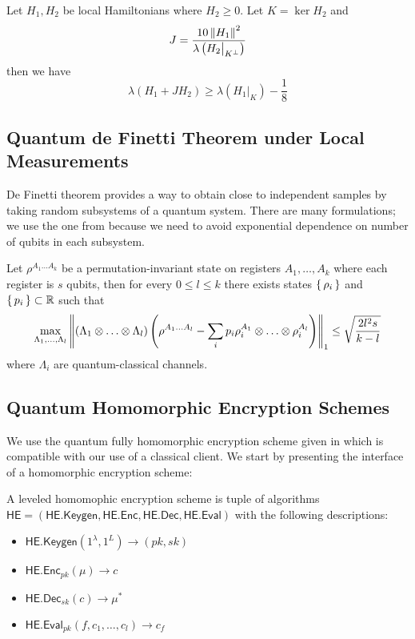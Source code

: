 \begin{thm}
	\label{thm:projection}
	Let $H_1, H_2$ be local Hamiltonians where $H_2\geq0$. Let $K=\ker H_2$ and
	$$J=\frac{10\left\lVert H_1\right\rVert^2}{\lambda\left(H_2\big|_{K^\bot}\right)}$$
	then we have
	$$\lambda(H_1+JH_2)\geq\lambda\left(H_1\big|_K\right)-\frac{1}{8}$$
\end{thm}

\subsection{Quantum de Finetti Theorem under Local Measurements}

De Finetti theorem provides a way to obtain close to independent samples by taking random subsystems of a quantum system.
There are many formulations; we use the one from \cite{Brandão2017} because we need to avoid exponential dependence on number of qubits in each subsystem.
\begin{thm}
	\label{deFinetti}
	Let $\rho^{A_1\ldots A_k}$ be a permutation-invariant state on registers $A_1,\ldots,A_k$ where each register is $s$ qubits,
	then for every $0\leq l\leq k$ there exists states $\set{\rho_i}$ and $\set{p_i}\subset\mathbb{R}$ such that
	$$\max_{\Lambda_1,\ldots,\Lambda_l}
	\left\lVert(\Lambda_1\otimes\ldots\otimes\Lambda_l)\left(\rho^{A_1\ldots A_l}-\sum_ip_i\rho_i^{A_1}\otimes\ldots\otimes\rho_i^{A_l}\right)\right\rVert_1
	\leq\sqrt{\frac{2l^2s}{k-l}}$$
	where $\Lambda_i$ are quantum-classical channels.
\end{thm}

\subsection{Quantum Homomorphic Encryption Schemes}

\def\QHE{\mathsf{QHE}}
\def\QGen{\mathsf{QHE.Keygen}}
\def\QEnc{\mathsf{QHE.Enc}}
\def\QEval{\mathsf{QHE.Eval}}
\def\QDec{\mathsf{QHE.Dec}}

We use the quantum fully homomorphic encryption scheme given in \cite{mahadev_qfhe} which is compatible with our use of a classical client. We start by presenting the interface of a homomorphic encryption scheme:
\begin{definition}
	A leveled homomophic encryption scheme is tuple of algorithms $\mathsf{HE}=(\mathsf{HE.Keygen}, \mathsf{HE.Enc}, \mathsf{HE.Dec}, \mathsf{HE.Eval})$ with the following descriptions:
	\begin{itemize}
		\item $\mathsf{HE.Keygen}(1^\lambda, 1^L)\rightarrow(pk, sk)$
		\item $\mathsf{HE.Enc}_{pk}(\mu)\rightarrow c$
		\item $\mathsf{HE.Dec}_{sk}(c)\rightarrow \mu^*$
		\item $\mathsf{HE.Eval}_{pk}(f, c_1, \ldots, c_l)\rightarrow c_f$
	\end{itemize}
\end{definition}

